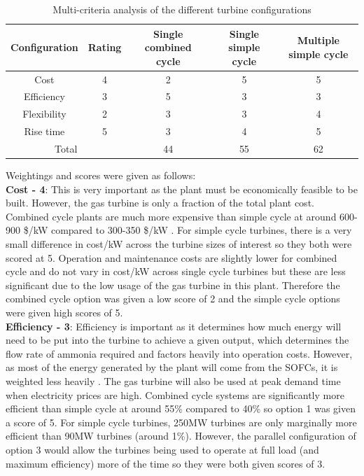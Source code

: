 \documentclass[11pt, oneside]{article}
\begin{document}
\begin {table} [h]
\begin{center}
\caption{Multi-criteria analysis of the different turbine configurations} \label{tab:MCA} 
\begin{tabular}{ |c|c|c|c|c| }
 \hline
  Configuration & Rating & Single combined cycle & Single simple cycle & Multiple simple cycle\\ 
 \hline
  Cost & 4 & 2 & 5 & 5 \\ 
 \hline
  Efficiency & 3 & 5 & 3 & 3\\ 
 \hline
  Flexibility & 2 & 3 & 3 & 4\\
 \hline
  Rise time & 5 & 3 & 4 & 5\\
   \hline
   \multicolumn{2}{|c|}{Total}  & 44 & 55 & 62 \\
 \hline
\end{tabular}
\end{center}  
\end {table}
Weightings and scores were given as follows: 
\\\textbf{Cost - 4}: This is very important as the plant must be economically feasible to be built. However, the gas turbine is only a fraction of the total plant cost. Combined cycle plants are much more expensive than simple cycle at around 600-900 \$/kW compared to 300-350 \$/kW \cite{turbinecost}. For simple cycle turbines, there is a very small difference in cost/kW across the turbine sizes of interest so they both were scored at 5. Operation and maintenance costs are slightly lower for combined cycle and do not vary in cost/kW across single cycle turbines but these are less significant due to the low usage of the gas turbine in this plant. \cite{boyce} Therefore the combined cycle option was given a low score of 2 and the simple cycle options were given high scores of 5.
\\\textbf{Efficiency - 3}: Efficiency is important as it determines how much energy will need to be put into the turbine to achieve a given output, which determines the flow rate of ammonia required and factors heavily into operation costs. However, as most of the energy generated by the plant will come from the SOFCs, it is weighted less heavily . The gas turbine will also be used at peak demand time when electricity prices are high. Combined cycle systems are significantly more efficient than simple cycle at around 55\% compared to 40\% so option 1 was given a score of 5. For simple cycle turbines, 250MW turbines are only marginally more efficient than 90MW turbines (around 1\%). However, the parallel configuration of option 3 would allow the turbines being used to operate at full load (and maximum efficiency) more of the time so they were both given scores of 3.
\end{document}
